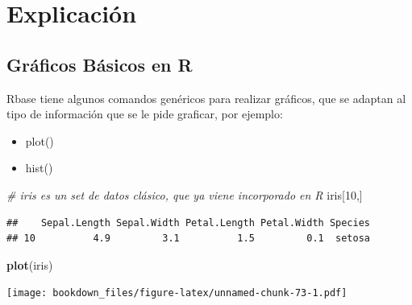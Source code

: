 \documentclass[]{book}
\newenvironment{Shaded}{\begin{snugshade}}{\end{snugshade}}
\newcommand{\CommentTok}[1]{\textcolor[rgb]{0.56,0.35,0.01}{\textit{#1}}}
\newcommand{\DataTypeTok}[1]{\textcolor[rgb]{0.13,0.29,0.53}{#1}}
\newcommand{\DecValTok}[1]{\textcolor[rgb]{0.00,0.00,0.81}{#1}}
\newcommand{\KeywordTok}[1]{\textcolor[rgb]{0.13,0.29,0.53}{\textbf{#1}}}
\newcommand{\NormalTok}[1]{#1}
\newcommand{\OperatorTok}[1]{\textcolor[rgb]{0.81,0.36,0.00}{\textbf{#1}}}
\newcommand{\StringTok}[1]{\textcolor[rgb]{0.31,0.60,0.02}{#1}}
\providecommand{\tightlist}{%
  \setlength{\itemsep}{0pt}\setlength{\parskip}{0pt}}
\begin{document}
\hypertarget{explicacion-2}{%
\section{Explicación}\label{explicacion-2}}

\hypertarget{graficos-basicos-en-r}{%
\subsection{Gráficos Básicos en R}\label{graficos-basicos-en-r}}

Rbase tiene algunos comandos genéricos para realizar gráficos, que se adaptan al tipo de información que se le pide graficar, por ejemplo:

\begin{itemize}
\tightlist
\item
  plot()
\item
  hist()
\end{itemize}

\begin{Shaded}
\begin{Highlighting}[]
\CommentTok{# iris es un set de datos clásico, que ya viene incorporado en R}
\NormalTok{iris[}\DecValTok{10}\NormalTok{,]}
\end{Highlighting}
\end{Shaded}

\begin{verbatim}
##    Sepal.Length Sepal.Width Petal.Length Petal.Width Species
## 10          4.9         3.1          1.5         0.1  setosa
\end{verbatim}

\begin{Shaded}
\begin{Highlighting}[]
\KeywordTok{plot}\NormalTok{(iris)}
\end{Highlighting}
\end{Shaded}

\texttt{[image: bookdown\_files/figure-latex/unnamed-chunk-73-1.pdf]}

\begin{Shaded}
\end{Shaded}
\end{document}

